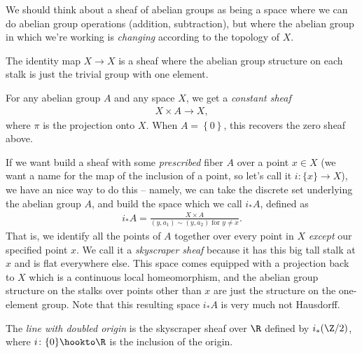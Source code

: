\documentclass[11pt]{book}
\begin{document}
We should think about a sheaf of abelian groups as being a space where we can do abelian group operations (addition, subtraction), but where the abelian group in which we're working is \emph{changing} according to the topology of $X$.

\begin{example} The identity map $X \to X$ is a sheaf where the abelian group structure on each stalk is just the trivial group with one element.
\end{example}


\begin{example}
\label{exa:constant-sheaf-espace-etale}
For any abelian group $A$ and any space $X$, we get a \emph{constant sheaf}
\begin{align*}
    X \times A \to X,
\end{align*}
where $\pi$ is the projection onto $X$. When $A = \left\{ 0 \right\}$, this recovers the zero sheaf above.
\end{example}

\begin{example}
\label{exa:skyscraper-sheaves}
If we want build a sheaf with some \emph{prescribed} fiber $A$ over a point $x\in X$ (we want a name for the map of the inclusion of a point, so let's call it $i \colon \{x\} \to X$), we have an nice way to do this -- namely, we can take the discrete set underlying the abelian group $A$, and build the space which we call $i_\ast A$, defined as
\begin{align*}
    i_\ast A = \frac{X \times A}{(y,a_1)\sim (y,a_2)\text{ for }y\ne x}.
\end{align*}
That is, we identify all the points of $A$ together over every point in $X$ \emph{except} our specified point $x$. We call it a \emph{skyscraper sheaf} because it has this big tall stalk at $x$ and is flat everywhere else. This space comes equipped with a projection back to $X$ which is a continuous local homeomorphism, and the abelian group structure on the stalks over points other than $x$ are just the structure on the one-element group. Note that this resulting space $i_\ast A$ is very much not Hausdorff.
\end{example}


\begin{example} The \emph{line with doubled origin} is the skyscraper sheaf over $\R$ defined by $i_\ast (\Z/2)$, where $i \colon \{0\}\hookto \R$ is the inclusion of the origin.
\end{example}
\end{document}
